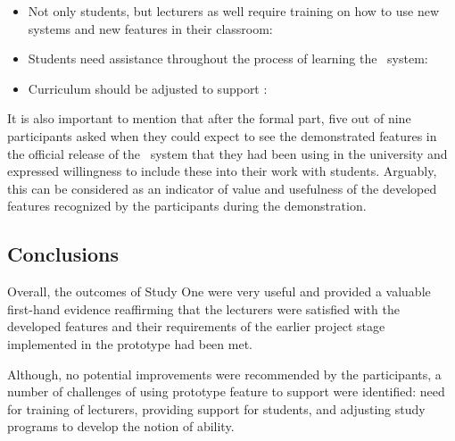 \begin{itemize}
  \item Not only students, but lecturers as well require training on how to
  use new systems and new features in their classroom:
  
  \item Students need assistance throughout the process of learning the
  \ep~system: 
  
  \item Curriculum should be adjusted to support \LLLsn:
\end{itemize}

It is also important to mention that after the formal part, five out of nine
participants asked when they could expect to see the demonstrated features in
the official release of the \ep~system that they had been using in the
university and expressed willingness to include these into their work with
students. Arguably, this can be considered as an indicator of value and
usefulness of the developed features recognized by the participants during the
demonstration.

\subsection{Conclusions}

Overall, the outcomes of Study One were very useful and provided a valuable
first-hand evidence reaffirming that the lecturers were satisfied with the
developed features and their requirements of the earlier project stage
implemented in the prototype had been met.

Although, no potential improvements were recommended by the participants, a
number of challenges of using prototype feature to support \LLLs were
identified: need for training of lecturers, providing support for students, and
adjusting study programs to develop the notion of \LLLs ability.

